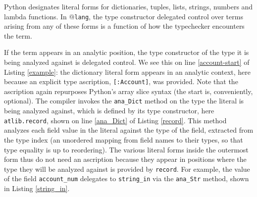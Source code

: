 \documentclass[9pt]{sigplanconf}
\newcommand{\lstinlinep}[1]{\lstinline[language=Python,basicstyle=\ttfamily\small,deletendkeywords={tuple,buffer,map}]{#1}}
\begin{document}
Python designates literal forms for dictionaries, tuples, lists, strings, numbers and lambda functions. In @\texttt{lang}, the type constructor delegated control over terms arising from any of these forms is a function of how the typechecker encounters the term.

If the term appears in an analytic position, the type constructor of the type it is being analyzed against is delegated control. We see this on line \ref{account-start} of Listing \ref{example}: the dictionary literal form appears in an analytic context, here because an explicit type ascription, \lstinlinep{[:Account]}, was provided. Note that the ascription again repurposes Python's array slice syntax (the start is, conveniently,  optional). The compiler invokes the \lstinlinep{ana_Dict} method on the type the literal is being analyzed against, which is defined by its type constructor, here \lstinlinep{atlib.record}, shown on line \ref{ana_Dict} of Listing \ref{record}. This method analyzes each field value in the literal against the type of the field, extracted from the type index (an unordered mapping from field names to their types, so that type equality is up to reordering). The various literal forms inside the outermost form thus do not need an ascription because they appear in positions where the type they will be analyzed against is provided by \lstinlinep{record}. For example, the value of the field \lstinlinep{account_num} delegates to \lstinlinep{string_in} via the \lstinlinep{ana_Str} method, shown in Listing \ref{string_in}.
\end{document}

